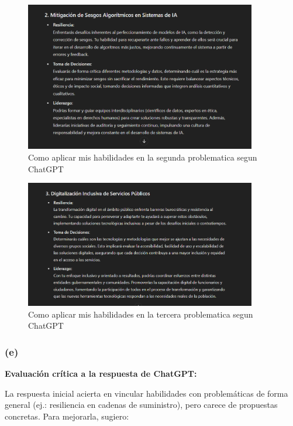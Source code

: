 \documentclass[12pt]{article}
\begin{document}
\begin{figure}[h]
    \centering
    \includegraphics[width=0.9\textwidth]{img/problematica_2.png}
    \caption{Como aplicar mis habilidades en la segunda problematica segun ChatGPT}
\end{figure}
\begin{figure}[h]
    \centering
    \includegraphics[width=0.9\textwidth]{img/problematica_3.png}
    \caption{Como aplicar mis habilidades en la tercera problematica segun ChatGPT}
\end{figure}
\clearpage

\subsubsection*{(e)}

\textbf{Evaluación crítica a la respuesta de ChatGPT:}  

La respuesta inicial acierta en vincular habilidades con problemáticas de forma general (ej.: resiliencia en cadenas de suministro), pero carece de propuestas concretas. Para mejorarla, sugiero:  
\end{document}
